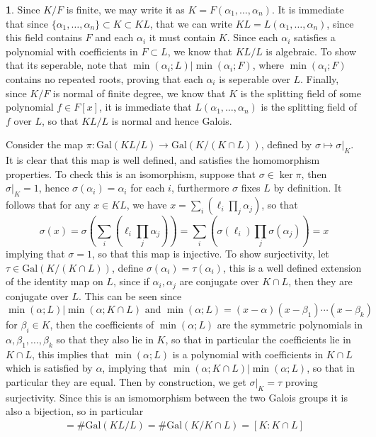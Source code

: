 \documentclass[11pt]{article}
\theoremstyle{definition}
\newtheorem{pb}{}
\newcommand{\set}[1]{\{#1\}}
\newcommand{\tand}{\text{ and }}
\newcommand{\gal}{\text{Gal}}
\begin{document}
    \begin{pb}
        Since \(K/F\) is finite, we may write it as \(K = F(\alpha_1, \hdots, \alpha_n)\). It is immediate that since \(\set{\alpha_1,\hdots,\alpha_n} \subset K \subset KL\), that we can write
        \(KL = L(\alpha_1,\hdots,\alpha_n)\), since this field contains \(F\) and each \(\alpha_i\) it must contain \(K\). Since each \(\alpha_i\) satisfies a polynomial with coefficients in
        \(F \subset L\), we know that \(KL/L\) is algebraic. To show that its seperable, note that \(\min(\alpha_i;L) \vert \min(\alpha_i;F)\), where \(\min(\alpha_i;F)\) contains no repeated roots, proving that
        each \(\alpha_i\) is seperable over \(L\). Finally, since \(K/F\) is normal of finite degree, we know that \(K\) is the splitting field of some polynomial \(f \in F[x]\), it is immediate that
        \(L(\alpha_1,\hdots,\alpha_n)\) is the splitting field of \(f\) over \(L\), so that \(KL/L\) is normal and hence Galois.

        Consider the map \(\pi: \gal(KL/L) \to \gal(K/(K\cap L))\), defined by \(\sigma \mapsto \sigma \vert_K\). It is clear that this map is well defined, and satisfies the homomorphism properties.
        To check this is an isomorphism, suppose that \(\sigma \in \ker \pi\), then \(\sigma \vert_K = 1\), hence \(\sigma(\alpha_i) = \alpha_i\) for each \(i\), furthermore \(\sigma\) fixes \(L\) by definition.
        It follows that for any \(x \in KL\), we have \(x = \sum_i \left(\ell_i \prod_{j}\alpha_j\right)\), so that 
        \[\sigma(x) = \sigma\left(\sum_i \left(\ell_i \prod_{j}\alpha_j\right)\right) = \sum_i \left(\sigma(\ell_i) \prod_{j}\sigma(\alpha_j)\right) = x\]
        implying that \(\sigma = 1\), so that this map is injective. To show surjectivity,
        let \(\tau \in \gal(K/(K\cap L))\), define \(\sigma(\alpha_i) = \tau(\alpha_i)\), this is a well defined extension of the identity map on \(L\), 
        since if \(\alpha_i, \alpha_j\) are conjugate over \(K \cap L\), then they are conjugate over \(L\). This can be seen since
        \[\min(\alpha;L) \vert \min(\alpha;K\cap L) \tand \min(\alpha;L) = (x - \alpha)(x-\beta_1)\cdots(x-\beta_k)\]
        for \(\beta_i \in K\), then the coefficients of \(\min(\alpha;L)\) are the symmetric polynomials in \(\alpha,\beta_1,\hdots,\beta_k\) so that they also lie in \(K\), so that in particular
        the coefficients lie in \(K \cap L\), this implies that \(\min(\alpha;L)\) is a polynomial with coefficients in \(K\cap L\) which is satisfied by \(\alpha\),
        implying that \(\min(\alpha;K\cap L) \vert \min(\alpha;L)\), so that in particular they are equal.
        Then by construction, we get \(\sigma\vert_K = \tau\) proving surjectivity. Since this is an ismomorphism between the two Galois groups it is also a bijection, so in particular
        \begin{align*}
            [KL:L] = \# \gal(KL/L) = \# \gal(K/K\cap L) = [K:K\cap L]
        \end{align*}
    \end{pb}
\end{document}
